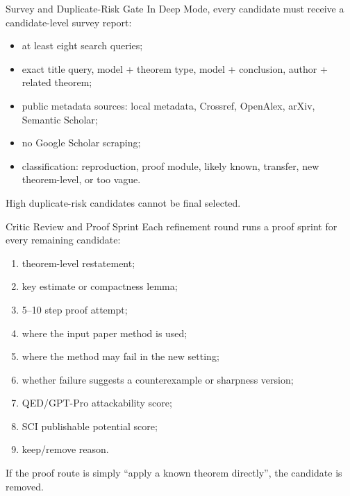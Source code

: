 \documentclass[aspectratio=169,11pt]{beamer}
\begin{document}
\begin{frame}{Survey and Duplicate-Risk Gate}
  In Deep Mode, every candidate must receive a candidate-level survey report:

  \begin{itemize}
    \item at least eight search queries;
    \item exact title query, model + theorem type, model + conclusion, author + related theorem;
    \item public metadata sources: local metadata, Crossref, OpenAlex, arXiv, Semantic Scholar;
    \item no Google Scholar scraping;
    \item classification: reproduction, proof module, likely known, transfer, new theorem-level, or too vague.
  \end{itemize}

  \vspace{0.4em}
  High duplicate-risk candidates cannot be final selected.
\end{frame}

\begin{frame}{Critic Review and Proof Sprint}
  Each refinement round runs a proof sprint for every remaining candidate:

  \begin{enumerate}
    \item theorem-level restatement;
    \item key estimate or compactness lemma;
    \item 5--10 step proof attempt;
    \item where the input paper method is used;
    \item where the method may fail in the new setting;
    \item whether failure suggests a counterexample or sharpness version;
    \item QED/GPT-Pro attackability score;
    \item SCI publishable potential score;
    \item keep/remove reason.
  \end{enumerate}

  \vspace{0.4em}
  If the proof route is simply ``apply a known theorem directly'', the candidate is removed.
\end{frame}
\end{document}
